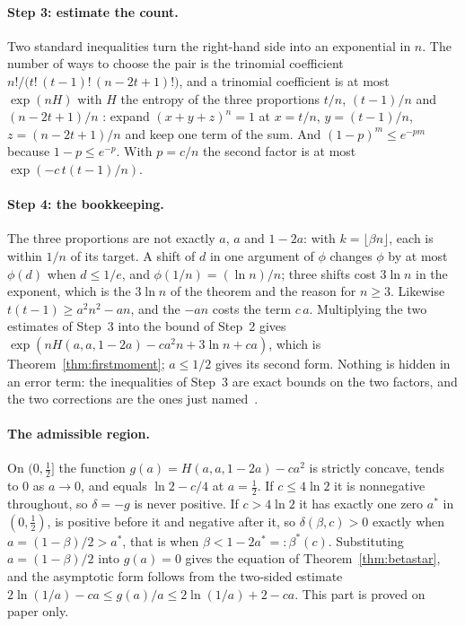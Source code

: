 \paragraph{Step 3: estimate the count.}
Two standard inequalities turn the right-hand side into an exponential in
$n$. The number of ways to choose the pair is the trinomial coefficient
$n!/\bigl(t!\,(t-1)!\,(n-2t+1)!\bigr)$, and a trinomial coefficient is at most
$\exp(nH)$ with $H$ the entropy of the three proportions $t/n$, $(t-1)/n$ and
$(n-2t+1)/n$ \citep[Theorem~11.1.3]{CoverThomas2006}: expand
$(x+y+z)^{n}=1$ at $x=t/n$, $y=(t-1)/n$, $z=(n-2t+1)/n$ and keep one term of
the sum. And $(1-p)^{m}\le e^{-pm}$ because $1-p\le e^{-p}$. With $p=c/n$ the
second factor is at most $\exp(-c\,t(t-1)/n)$.

\paragraph{Step 4: the bookkeeping.}
The three proportions are not exactly $a$, $a$ and $1-2a$: with
$k=\lfloor\beta n\rfloor$, each is within $1/n$ of its target. A shift of $d$
in one argument of $\phi$ changes $\phi$ by at most $\phi(d)$ when $d\le1/e$,
and $\phi(1/n)=(\ln n)/n$; three shifts cost $3\ln n$ in the exponent, which
is the $3\ln n$ of the theorem and the reason for $n\ge3$. Likewise
$t(t-1)\ge a^{2}n^{2}-an$, and the $-an$ costs the term $c\,a$. Multiplying
the two estimates of Step~3 into the bound of Step~2 gives
$\exp(nH(a,a,1-2a)-ca^{2}n+3\ln n+ca)$, which is Theorem~\ref{thm:firstmoment};
$a\le1/2$ gives its second form. Nothing is hidden in an error term: the
inequalities of Step~3 are exact bounds on the two factors, and the two
corrections are the ones just named~.

\paragraph{The admissible region.}
On $(0,\tfrac12]$ the function $g(a)=H(a,a,1-2a)-ca^{2}$ is strictly concave,
tends to $0$ as $a\to0$, and equals $\ln2-c/4$ at $a=\tfrac12$. If
$c\le4\ln2$ it is nonnegative throughout, so $\delta=-g$ is never positive.
If $c>4\ln2$ it has exactly one zero $a^{*}$ in $(0,\tfrac12)$, is positive
before it and negative after it, so $\delta(\beta,c)>0$ exactly when
$a=(1-\beta)/2>a^{*}$, that is when $\beta<1-2a^{*}=:\beta^{*}(c)$.
Substituting $a=(1-\beta)/2$ into $g(a)=0$ gives the equation of
Theorem~\ref{thm:betastar}, and the asymptotic form follows from the
two-sided estimate $2\ln(1/a)-ca\le g(a)/a\le2\ln(1/a)+2-ca$. This part is
proved on paper only.


